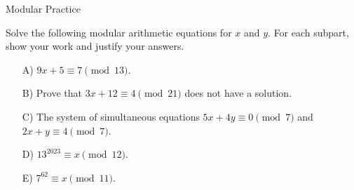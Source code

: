 \begin{homeworkProblem}{Modular Practice}

    Solve the following modular arithmetic equations for $x$ and $y$. For each subpart, show your work and justify your answers.

    \begin{itemize}
        \item[A)] $9x+5 \equiv 7 \pmod{13}$.
        \item[B)] Prove that $3x+12 \equiv 4 \pmod{21}$ does not have a solution.
        \item[C)] The system of simultaneous equations $5x+4y \equiv 0 \pmod{7}$ and $2x+y \equiv 4 \pmod{7}$. 
        \item[D)] $13^{2023} \equiv x \pmod{12}$.
        \item[E)] $7^{62} \equiv x \pmod{11}$.
    \end{itemize}
    
\end{homeworkProblem}